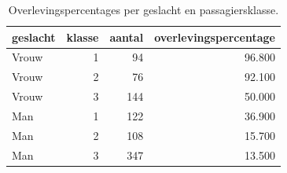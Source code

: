 \begin{table}[htbp]
\caption{Overlevingspercentages per geslacht en passagiersklasse.}
\label{tab:overlevingsgroepen}
\begin{tabular}{lrrr}
\toprule
geslacht & klasse & aantal & overlevingspercentage \\
\midrule
Vrouw & 1 & 94 & 96.800 \\
Vrouw & 2 & 76 & 92.100 \\
Vrouw & 3 & 144 & 50.000 \\
Man & 1 & 122 & 36.900 \\
Man & 2 & 108 & 15.700 \\
Man & 3 & 347 & 13.500 \\
\bottomrule
\end{tabular}
\end{table}
